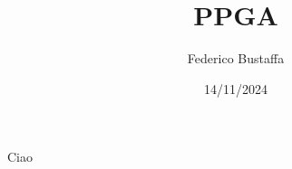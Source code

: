\documentclass[12pt]{report}
\title{PPGA}
\author{Federico Bustaffa}
\date{14/11/2024}
\begin{document}
\maketitle
\tableofcontents

Ciao
\end{document}
